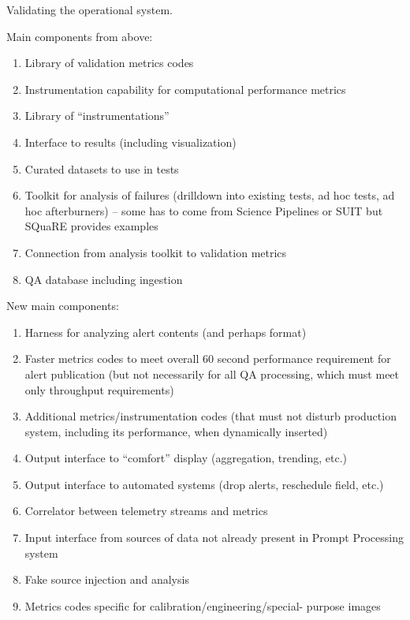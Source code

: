 Validating the operational system.

Main components from above:
\begin{enumerate}
\item Library of validation metrics codes
\item Instrumentation capability for computational performance metrics
\item Library of “instrumentations”
\item Interface to results (including visualization)
\item Curated datasets to use in tests
\item Toolkit for analysis of failures (drilldown into existing tests, ad hoc tests, ad hoc afterburners) – some has to come from Science Pipelines or SUIT but SQuaRE provides examples
\item Connection from analysis toolkit to validation metrics
\item QA database including ingestion
\end{enumerate}

New main components:
\begin{enumerate}
\item Harness for analyzing alert contents (and perhaps format)
\item Faster metrics codes to meet overall 60 second performance requirement for alert publication (but not necessarily for all QA processing, which must meet only throughput requirements)
\item Additional metrics/instrumentation codes (that must not disturb production system, including its performance, when dynamically inserted)
\item Output interface to “comfort” display (aggregation, trending, etc.)
\item Output interface to automated systems (drop alerts, reschedule field, etc.)
\item Correlator between telemetry streams and metrics
\item Input interface from sources of data not already present in Prompt Processing system
\item Fake source injection and analysis
\item Metrics codes specific for calibration/engineering/special- purpose images
\end{enumerate}

